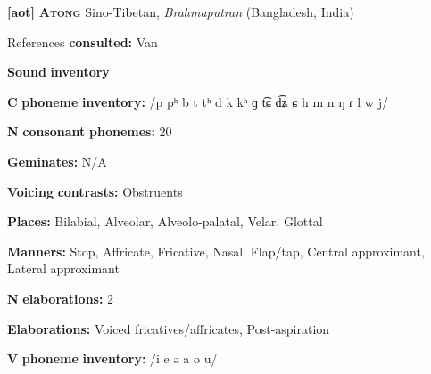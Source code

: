 \documentclass[output=paper]{langsci/langscibook}
\begin{document}
\begin{styleBody}
\textbf{[aot]}   \textbf{\textsc{Atong}  }  Sino-Tibetan, \textit{Brahmaputran} (Bangladesh, India)
\end{styleBody}

\begin{styleBody}
References \textbf{consulted:} Van \citet{Breugel2008}
\end{styleBody}

\begin{styleBody}
\textbf{Sound} \textbf{inventory}
\end{styleBody}

\begin{styleBody}
\textbf{C} \textbf{phoneme} \textbf{inventory:} /p pʰ b t tʰ d k kʰ ɡ t͡ɕ d͡ʑ ɕ h m n ŋ ɾ l w j/
\end{styleBody}

\begin{styleBody}
\textbf{N} \textbf{consonant} \textbf{phonemes:} 20
\end{styleBody}

\begin{styleBody}
\textbf{Geminates:} N/A
\end{styleBody}

\begin{styleBody}
\textbf{Voicing} \textbf{contrasts:} Obstruents
\end{styleBody}

\begin{styleBody}
\textbf{Places:} Bilabial, Alveolar, Alveolo-palatal, Velar, Glottal
\end{styleBody}

\begin{styleBody}
\textbf{Manners:} Stop, Affricate, Fricative, Nasal, Flap/tap, Central approximant, Lateral approximant
\end{styleBody}

\begin{styleBody}
\textbf{N} \textbf{elaborations:} 2
\end{styleBody}

\begin{styleBody}
\textbf{Elaborations:} Voiced fricatives/affricates, Post-aspiration
\end{styleBody}

\begin{styleBody}
\textbf{V} \textbf{phoneme} \textbf{inventory:} /i e ə a o u/
\end{styleBody}
\end{document}
